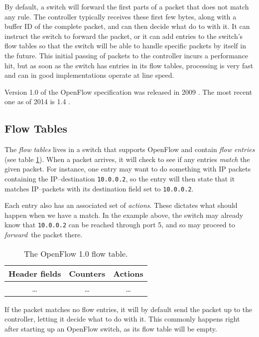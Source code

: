 By default, a switch will forward the first parts of a packet that does not
match any rule.  The controller typically receives these first few bytes,
along with a buffer ID of the complete packet, and can then decide
what do to with it.  It can instruct the switch to forward the packet,
or it can add entries to the switch's flow tables so that the switch
will be able to handle specific packets by itself in the future.  This
initial passing of packets to the controller incurs a performance hit,
but as soon as the switch has entries in its flow tables, processing
is very fast and can in good implementations operate at line speed.

Version 1.0 of the OpenFlow specification was released in 2009
\cite{openflow-1.0} \cite{openflow-1.0.1} \cite{openflow-1.0.2}.
The most recent one as of 2014 is 1.4 \cite{openflow-1.4}.

\subsection{Flow Tables}

The \textit{flow tables} lives in a switch that supports OpenFlow and
contain \textit{flow entries} (see table \ref{openflow.flow.entry.spec}).
When a packet arrives, it will check to see
if any entries \textit{match} the given packet.  For instance, one entry may
want to do something with \ac{IP} packets containing the IP--destination
\texttt{10.0.0.2}, so the entry
will then state that it matches IP--packets with its destination field set
to \texttt{10.0.0.2}.

Each entry also has an associated set of \textit{actions}.  These dictates
what should happen when we have a match.  In the example above, the switch
may already know that \texttt{10.0.0.2} can be reached through port 5, and
so may proceed to \textit{forward} the packet there.

\begin{table}[H]
  \centering
  \begin{tabular}{|c|c|c|}
    \hline \textbf{Header fields} &
           \textbf{Counters} &
           \textbf{Actions} \\
    \hline \dots & \dots & \dots \\
  \end{tabular}

  \caption{The OpenFlow 1.0 flow table.}
  \label{openflow.flow.entry.spec}
\end{table}

If the packet matches no flow entries, it will by default send the packet up
to the controller, letting it decide what to do with it.  This commonly
happens right after starting up an OpenFlow switch, as its flow table will
be empty.

